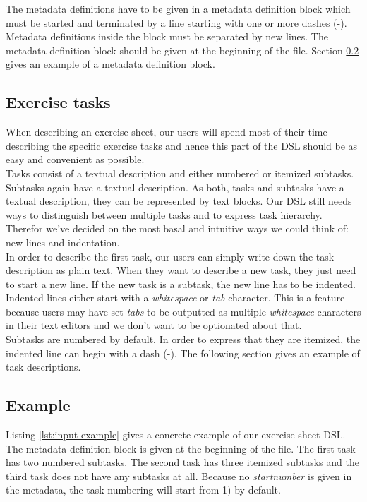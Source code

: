 \documentclass[12pt,letterpaper, onecolumn]{article}
\begin{document}
The metadata definitions have to be given in a metadata definition block which must be started and terminated by a line starting with one or more dashes (-). Metadata definitions inside the block must be separated by new lines. The metadata definition block should be given at the beginning of the file. Section \ref{sec:dsl-example} gives an example of a metadata definition block.\\

\subsection{Exercise tasks}

When describing an exercise sheet, our users will spend most of their time describing the specific exercise tasks and hence this part of the DSL should be as easy and convenient as possible.\\

Tasks consist of a textual description and either numbered or itemized subtasks. Subtasks again have a textual description. As both, tasks and subtasks have a textual description, they can be represented by text blocks. Our DSL still needs ways to distinguish between multiple tasks and to express task hierarchy. Therefor we've decided on the most basal and intuitive ways we could think of: new lines and indentation.\\

In order to describe the first task, our users can simply write down the task description as plain text. When they want to describe a new task, they just need to start a new line. If the new task is a subtask, the new line has to be indented. Indented lines either start with a \emph{whitespace} or \emph{tab} character. This is a feature because users may have set \emph{tabs} to be outputted as multiple \emph{whitespace} characters in their text editors and we don't want to be optionated about that.\\

Subtasks are numbered by default. In order to express that they are itemized, the indented line can begin with a dash (-). The following section gives an example of task descriptions.\\

\subsection{Example}\label{sec:dsl-example}

Listing \ref{lst:input-example} gives a concrete example of our exercise sheet DSL. The metadata definition block is given at the beginning of the file. The first task has two numbered subtasks. The second task has three itemized subtasks and the third task does not have any subtasks at all. Because no \emph{startnumber} is given in the metadata, the task numbering will start from 1) by default.
\end{document}
